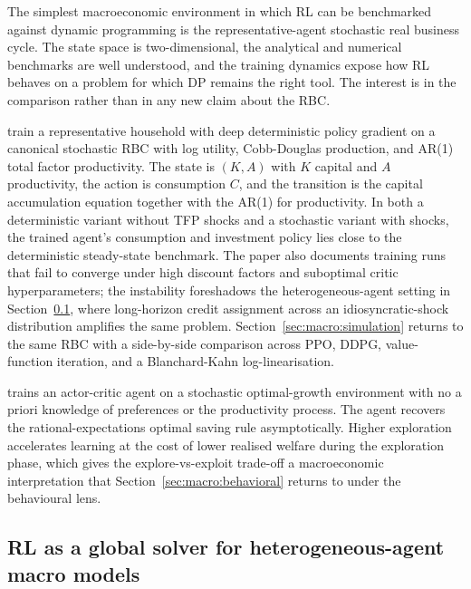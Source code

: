 The simplest macroeconomic environment in which RL can be benchmarked
against dynamic programming is the representative-agent stochastic
real business cycle. The state space is two-dimensional, the
analytical and numerical benchmarks are well understood, and the
training dynamics expose how RL behaves on a problem for which DP
remains the right tool. The interest is in the comparison rather
than in any new claim about the RBC.

\citet{Atashbar2023imf} train a representative household with deep
deterministic policy gradient on a canonical stochastic RBC with
log utility, Cobb-Douglas production, and AR(1) total factor
productivity. The state is $(K, A)$ with $K$ capital and $A$
productivity, the action is consumption $C$, and the transition is
the capital accumulation equation together with the AR(1) for
productivity. In both a deterministic variant without TFP shocks and
a stochastic variant with shocks, the trained agent's consumption and
investment policy lies close to the deterministic steady-state
benchmark. The paper also documents training runs that fail to
converge under high discount factors and suboptimal critic
hyperparameters; the instability foreshadows the heterogeneous-agent
setting in
Section~\ref{sec:macro:solver}, where long-horizon credit assignment
across an idiosyncratic-shock distribution amplifies the same problem.
Section~\ref{sec:macro:simulation} returns to the same RBC with a
side-by-side comparison across PPO, DDPG, value-function iteration,
and a Blanchard-Kahn log-linearisation.

\citet{Shi2022consumption} trains an actor-critic agent on a
stochastic optimal-growth environment with no a priori knowledge of
preferences or the productivity process. The agent recovers the
rational-expectations optimal saving rule asymptotically. Higher
exploration accelerates learning at the cost of lower realised welfare
during the exploration phase, which gives the explore-vs-exploit
trade-off a macroeconomic interpretation that
Section~\ref{sec:macro:behavioral} returns to under the behavioural
lens.

\subsection{RL as a global solver for heterogeneous-agent macro models}
\label{sec:macro:solver}

